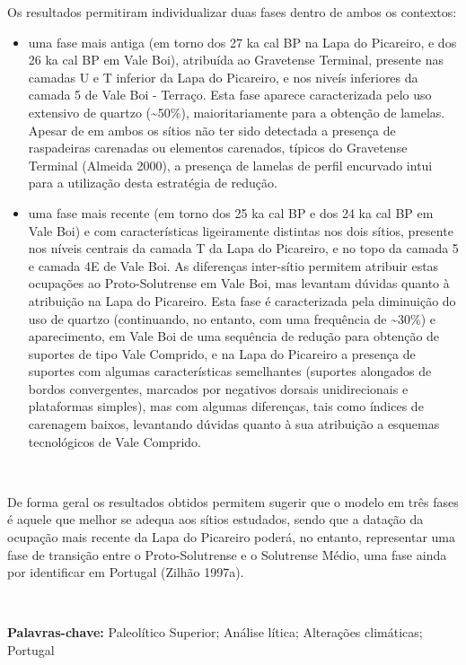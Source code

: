 \documentclass[12pt,twoside]{reedthesis}
\begin{document}
\begin{resumo}
    Os resultados permitiram individualizar duas fases dentro de ambos os contextos:
    \begin{itemize}
    \item
      uma fase mais antiga (em torno dos 27 ka cal BP na Lapa do Picareiro, e dos 26 ka cal BP em Vale Boi), atribuída ao Gravetense Terminal, presente nas camadas U e T inferior da Lapa do Picareiro, e nos niveís inferiores da camada 5 de Vale Boi - Terraço. Esta fase aparece caracterizada pelo uso extensivo de quartzo (\textasciitilde50\%), maioritariamente para a obtenção de lamelas. Apesar de em ambos os sítios não ter sido detectada a presença de raspadeiras carenadas ou elementos carenados, típicos do Gravetense Terminal (Almeida 2000), a presença de lamelas de perfil encurvado intui para a utilização desta estratégia de redução.
    \item
      uma fase mais recente (em torno dos 25 ka cal BP e dos 24 ka cal BP em Vale Boi) e com características ligeiramente distintas nos dois sítios, presente nos níveis centrais da camada T da Lapa do Picareiro, e no topo da camada 5 e camada 4E de Vale Boi. As diferenças inter-sítio permitem atribuir estas ocupações ao Proto-Solutrense em Vale Boi, mas levantam dúvidas quanto à atribuição na Lapa do Picareiro. Esta fase é caracterizada pela diminuição do uso de quartzo (continuando, no entanto, com uma frequência de \textasciitilde30\%) e aparecimento, em Vale Boi de uma sequência de redução para obtenção de suportes de tipo Vale Comprido, e na Lapa do Picareiro a presença de suportes com algumas características semelhantes (suportes alongados de bordos convergentes, marcados por negativos dorsais unidirecionais e plataformas simples), mas com algumas diferenças, tais como índices de carenagem baixos, levantando dúvidas quanto à sua atribuição a esquemas tecnológicos de Vale Comprido.
    \end{itemize}
    ~
    
    De forma geral os resultados obtidos permitem sugerir que o modelo em três fases é aquele que melhor se adequa aos sítios estudados, sendo que a datação da ocupação mais recente da Lapa do Picareiro poderá, no entanto, representar uma fase de transição entre o Proto-Solutrense e o Solutrense Médio, uma fase ainda por identificar em Portugal (Zilhão 1997a).
    
    ~
    
    \textbf{Palavras-chave:} Paleolítico Superior; Análise lítica; Alterações climáticas; Portugal
  \end{resumo}
  \hypersetup{linkcolor=black}
  \setcounter{tocdepth}{2}
  \tableofcontents
\end{document}
